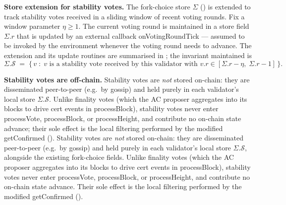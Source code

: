 \ifx\litemode\undefined\documentclass{article}\fi
\newcommand{\processBlock}{\textsf{processBlock}\xspace}
\newcommand{\processHeight}{\textsf{processHeight}\xspace}
\newcommand{\processVote}{\textsf{processVote}\xspace}
\newcommand{\onVotingRoundTick}{\textsf{onVotingRoundTick}\xspace}
\newcommand{\getConfirmed}{\textsf{getConfirmed}\xspace}
\renewcommand{\paragraph}[1]{\vspace{7pt}\noindent\textbf{#1}}
\theoremstyle{plain}
\theoremstyle{definition}
\theoremstyle{remark}
\begin{document}
\paragraph{Store extension for stability votes.}
The fork-choice store $\Sigma$ () is extended to track stability votes received in a sliding window of recent voting rounds.
Fix a window parameter $\eta \geq 1$.
The current voting round is maintained in a store field $\Sigma.r$ that is updated by an external callback \onVotingRoundTick{} --- assumed to be invoked by the environment whenever the voting round needs to advance.
The extension and its update routines are summarised in ; the invariant maintained is
\[
  \Sigma.\mathcal{S} \;=\; \{\,v \;:\; v \text{ is a stability vote received by this validator with } v.r \in [\Sigma.r - \eta,\; \Sigma.r - 1]\,\}.
\]

\paragraph{Stability votes are off-chain.}
Stability votes are \emph{not} stored on-chain: they are disseminated peer-to-peer (e.g.\ by gossip) and held purely in each validator's local store $\Sigma.\mathcal{S}$.
Unlike finality votes (which the AC proposer aggregates into its blocks to drive cert events in \processBlock{}), stability votes never enter \processVote{}, \processBlock{}, or \processHeight{}, and contribute no on-chain state advance; their sole effect is the local filtering performed by the modified \getConfirmed{} ().
Stability votes are \emph{not} stored on-chain: they are disseminated peer-to-peer (e.g.\ by gossip) and held purely in each validator's local store $\Sigma.\mathcal{S}$, alongside the existing fork-choice fields.
Unlike finality votes (which the AC proposer aggregates into its blocks to drive cert events in \processBlock{}), stability votes never enter \processVote{}, \processBlock{}, or \processHeight{}, and contribute no on-chain state advance.
Their sole effect is the local filtering performed by the modified \getConfirmed{} ().
\end{document}
